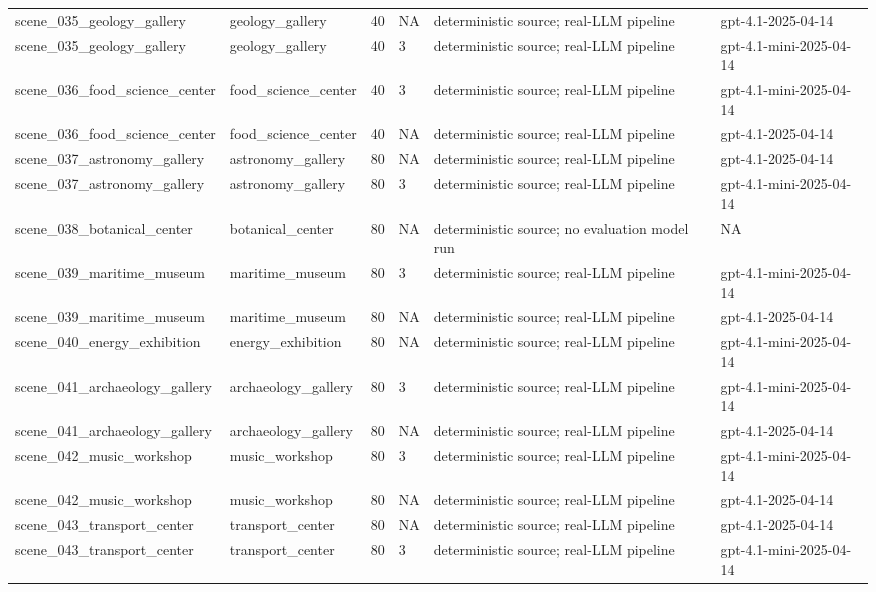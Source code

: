 \begin{tabular}{llllll}
scene\_035\_geology\_gallery & geology\_gallery & 40 & NA & deterministic source; real-LLM pipeline & gpt-4.1-2025-04-14 \\
scene\_035\_geology\_gallery & geology\_gallery & 40 & 3 & deterministic source; real-LLM pipeline & gpt-4.1-mini-2025-04-14 \\
scene\_036\_food\_science\_center & food\_science\_center & 40 & 3 & deterministic source; real-LLM pipeline & gpt-4.1-mini-2025-04-14 \\
scene\_036\_food\_science\_center & food\_science\_center & 40 & NA & deterministic source; real-LLM pipeline & gpt-4.1-2025-04-14 \\
scene\_037\_astronomy\_gallery & astronomy\_gallery & 80 & NA & deterministic source; real-LLM pipeline & gpt-4.1-2025-04-14 \\
scene\_037\_astronomy\_gallery & astronomy\_gallery & 80 & 3 & deterministic source; real-LLM pipeline & gpt-4.1-mini-2025-04-14 \\
scene\_038\_botanical\_center & botanical\_center & 80 & NA & deterministic source; no evaluation model run & NA \\
scene\_039\_maritime\_museum & maritime\_museum & 80 & 3 & deterministic source; real-LLM pipeline & gpt-4.1-mini-2025-04-14 \\
scene\_039\_maritime\_museum & maritime\_museum & 80 & NA & deterministic source; real-LLM pipeline & gpt-4.1-2025-04-14 \\
scene\_040\_energy\_exhibition & energy\_exhibition & 80 & NA & deterministic source; real-LLM pipeline & gpt-4.1-mini-2025-04-14 \\
scene\_041\_archaeology\_gallery & archaeology\_gallery & 80 & 3 & deterministic source; real-LLM pipeline & gpt-4.1-mini-2025-04-14 \\
scene\_041\_archaeology\_gallery & archaeology\_gallery & 80 & NA & deterministic source; real-LLM pipeline & gpt-4.1-2025-04-14 \\
scene\_042\_music\_workshop & music\_workshop & 80 & 3 & deterministic source; real-LLM pipeline & gpt-4.1-mini-2025-04-14 \\
scene\_042\_music\_workshop & music\_workshop & 80 & NA & deterministic source; real-LLM pipeline & gpt-4.1-2025-04-14 \\
scene\_043\_transport\_center & transport\_center & 80 & NA & deterministic source; real-LLM pipeline & gpt-4.1-2025-04-14 \\
scene\_043\_transport\_center & transport\_center & 80 & 3 & deterministic source; real-LLM pipeline & gpt-4.1-mini-2025-04-14 \\

\end{tabular}
